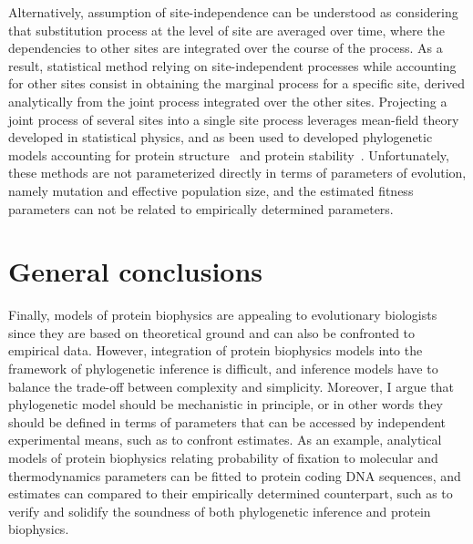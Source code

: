 Alternatively, assumption of site-independence can be understood as considering that substitution process at the level of site are averaged over time, where the dependencies to other sites are integrated over the course of the process.
As a result, statistical method relying on site-independent processes while accounting for other sites consist in obtaining the marginal process for a specific site, derived analytically from the joint process integrated over the other sites.
Projecting a joint process of several sites into a single site process leverages mean-field theory developed in statistical physics, and as been used to developed phylogenetic models accounting for protein structure~\citep{Chi2018} and protein stability~\citep{Arenas2015a, Arenas2017}.
Unfortunately, these methods are not parameterized directly in terms of parameters of evolution, namely mutation and effective population size, and the estimated fitness parameters can not be related to empirically determined parameters.

\section{General conclusions}

Finally, models of protein biophysics are appealing to evolutionary biologists since they are based on theoretical ground and can also be confronted to empirical data.
However, integration of protein biophysics models into the framework of phylogenetic inference is difficult, and inference models have to balance the trade-off between complexity and simplicity.
Moreover, I argue that phylogenetic model should be mechanistic in principle, or in other words they should be defined in terms of parameters that can be accessed by independent experimental means, such as to confront estimates.
As an example, analytical models of protein biophysics relating probability of fixation to molecular and thermodynamics parameters can be fitted to protein coding DNA sequences, and estimates can compared to their empirically determined counterpart, such as to verify and solidify the soundness of both phylogenetic inference and protein biophysics.